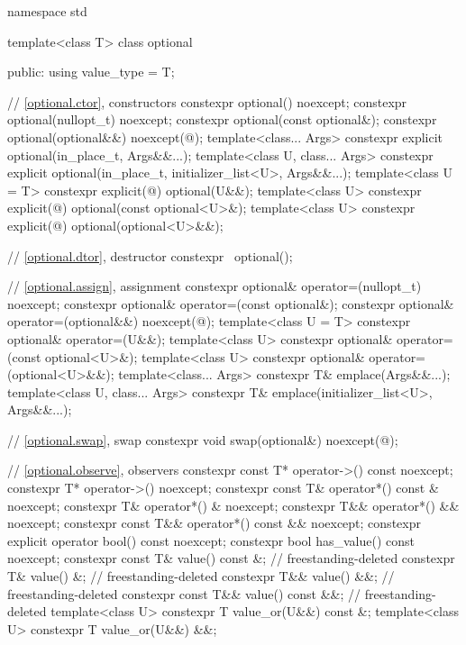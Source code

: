 %
%
\begin{codeblock}
namespace std {
  template<class T>
  class optional {
  public:
    using value_type = T;

    // \ref{optional.ctor}, constructors
    constexpr optional() noexcept;
    constexpr optional(nullopt_t) noexcept;
    constexpr optional(const optional&);
    constexpr optional(optional&&) noexcept(@\seebelow@);
    template<class... Args>
      constexpr explicit optional(in_place_t, Args&&...);
    template<class U, class... Args>
      constexpr explicit optional(in_place_t, initializer_list<U>, Args&&...);
    template<class U = T>
      constexpr explicit(@\seebelow@) optional(U&&);
    template<class U>
      constexpr explicit(@\seebelow@) optional(const optional<U>&);
    template<class U>
      constexpr explicit(@\seebelow@) optional(optional<U>&&);

    // \ref{optional.dtor}, destructor
    constexpr ~optional();

    // \ref{optional.assign}, assignment
    constexpr optional& operator=(nullopt_t) noexcept;
    constexpr optional& operator=(const optional&);
    constexpr optional& operator=(optional&&) noexcept(@\seebelow@);
    template<class U = T> constexpr optional& operator=(U&&);
    template<class U> constexpr optional& operator=(const optional<U>&);
    template<class U> constexpr optional& operator=(optional<U>&&);
    template<class... Args> constexpr T& emplace(Args&&...);
    template<class U, class... Args> constexpr T& emplace(initializer_list<U>, Args&&...);

    // \ref{optional.swap}, swap
    constexpr void swap(optional&) noexcept(@\seebelow@);

    // \ref{optional.observe}, observers
    constexpr const T* operator->() const noexcept;
    constexpr T* operator->() noexcept;
    constexpr const T& operator*() const & noexcept;
    constexpr T& operator*() & noexcept;
    constexpr T&& operator*() && noexcept;
    constexpr const T&& operator*() const && noexcept;
    constexpr explicit operator bool() const noexcept;
    constexpr bool has_value() const noexcept;
    constexpr const T& value() const &;                                 // freestanding-deleted
    constexpr T& value() &;                                             // freestanding-deleted
    constexpr T&& value() &&;                                           // freestanding-deleted
    constexpr const T&& value() const &&;                               // freestanding-deleted
    template<class U> constexpr T value_or(U&&) const &;
    template<class U> constexpr T value_or(U&&) &&;

}}
\end{codeblock}
